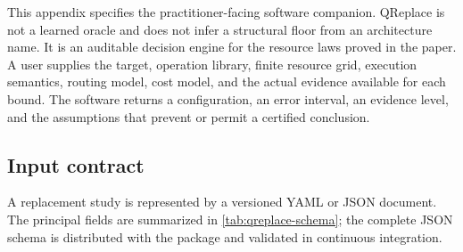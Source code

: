 \documentclass[twoside,11pt]{article}
\begin{document}
This appendix specifies the practitioner-facing software companion.  QReplace
is not a learned oracle and does not infer a structural floor from an
architecture name.  It is an auditable decision engine for the resource laws
proved in the paper.  A user supplies the target, operation library, finite
resource grid, execution semantics, routing model, cost model, and the actual
evidence available for each bound.  The software returns a configuration, an
error interval, an evidence level, and the assumptions that prevent or permit
a certified conclusion.

\subsection{Input contract}
\label{app:qreplace-input}

A replacement study is represented by a versioned YAML or JSON document.  The
principal fields are summarized in \cref{tab:qreplace-schema}; the complete
JSON schema is distributed with the package and validated in continuous
integration.
\end{document}
